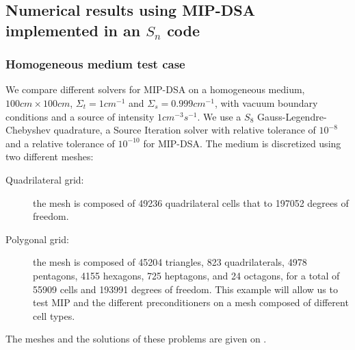 \subsection{Numerical results using MIP-DSA implemented in an $S_n$ code}

\subsubsection{Homogeneous medium test case}  \label{sec_homog}

We compare different solvers for MIP-DSA on a homogeneous medium, $100cm
\times 100cm$, $\Sigma_t = 1cm^{-1}$ and $\Sigma_s = 0.999cm^{-1}$, with
vacuum boundary conditions and a source of intensity $1cm^{-3}s^{-1}$. We
use a $S_8$ Gauss-Legendre-Chebyshev quadrature, a Source Iteration solver
with relative tolerance of $10^{-8}$ and a relative tolerance of
$10^{-10}$ for MIP-DSA. The medium is discretized using two different meshes:
\begin{description}
  \item[Quadrilateral grid:] the mesh is composed of 49236 quadrilateral
    cells that to 197052 degrees of freedom.
  \item[Polygonal grid:] the mesh is composed of 45204 triangles, 823
    quadrilaterals, 4978 pentagons, 4155 hexagons, 725 heptagons, and 24
    octagons, for a total of 55909 cells and 193991 degrees of freedom. This
    example will allow us to test MIP and the different preconditioners on a
    mesh composed of different cell types.
\end{description}
The meshes and the solutions of these problems are given on .
